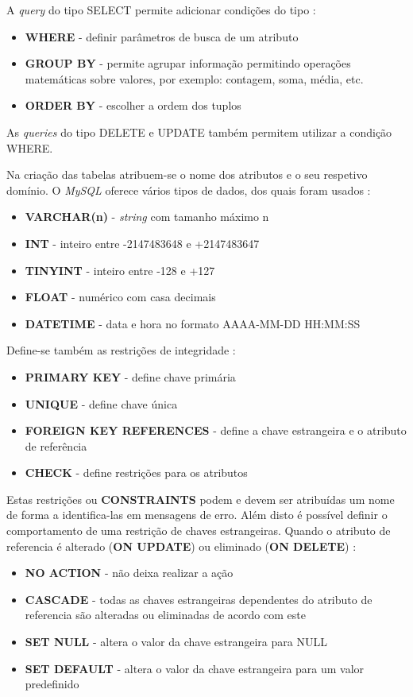 \documentclass[11pt,twoside,a4paper]{report}
\begin{document}
A \textit{query} do tipo SELECT permite adicionar condições do tipo \cite{mysql}:
\begin{itemize}
	\item \textbf{WHERE} - definir parâmetros de busca de um atributo
	\item \textbf{GROUP BY} - permite agrupar informação permitindo operações matemáticas sobre valores, por exemplo: contagem, soma, média, etc.
	\item \textbf{ORDER BY} - escolher a ordem dos tuplos
\end{itemize}
As \textit{queries} do tipo DELETE e UPDATE  também permitem utilizar a condição WHERE.\par 
Na criação das tabelas atribuem-se o nome dos atributos e o seu respetivo domínio. O \textit{MySQL} oferece vários tipos de dados, dos quais foram usados \cite{mysql}:
\begin{itemize}
	\item \textbf{VARCHAR(n)} - \textit{string} com tamanho máximo n
	\item \textbf{INT} - inteiro entre -2147483648 e +2147483647
	\item \textbf{TINYINT} - inteiro entre -128 e +127
	\item \textbf{FLOAT} - numérico com casa decimais
	\item \textbf{DATETIME} - data e hora no formato AAAA-MM-DD HH:MM:SS
\end{itemize}
Define-se também as restrições de integridade \cite{mysql}:
\begin{itemize}
	\item \textbf{PRIMARY KEY} - define chave primária
	\item \textbf{UNIQUE} - define chave única
	\item \textbf{FOREIGN KEY REFERENCES} - define a chave estrangeira e o atributo de referência
	\item \textbf{CHECK} - define restrições para os atributos
\end{itemize}
Estas restrições ou \textbf{CONSTRAINTS} podem e devem ser atribuídas um nome de forma a identifica-las em mensagens de erro. Além disto é possível definir o comportamento de uma restrição de chaves estrangeiras. Quando o atributo de referencia é alterado (\textbf{ON UPDATE}) ou eliminado (\textbf{ON DELETE}) \cite{mysql}:
\begin{itemize}
	\item \textbf{NO ACTION} - não deixa realizar a ação
	\item \textbf{CASCADE} - todas as chaves estrangeiras dependentes do atributo de referencia são alteradas ou eliminadas de acordo com este
	\item \textbf{SET NULL} - altera o valor da chave estrangeira para NULL
	\item \textbf{SET DEFAULT} - altera o valor da chave estrangeira para um valor predefinido
\end{itemize}
\end{document}
